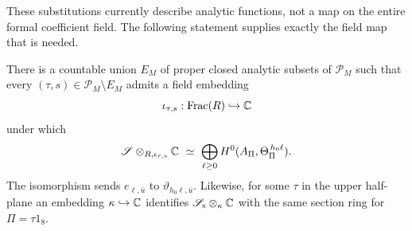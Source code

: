 These substitutions currently describe analytic functions, not a map
on the entire formal coefficient field.  The following statement supplies
exactly the field map that is needed.

\begin{proposition}\label{theta:realization}
There is a countable union $E_M$ of proper closed analytic subsets of
$\mathcal P_M$ such that every $(\tau,s)\in\mathcal P_M\setminus E_M$
admits a field embedding
\[
 \iota_{\tau,s}:\operatorname{Frac}(R)\hookrightarrow\mathbb C
\]
under which
\begin{equation}\label{theta:generic-section-ring}
 \mathscr S\otimes_{R,\iota_{\tau,s}}\mathbb C
 \ \simeq\
 \bigoplus_{\ell\geq0}
       H^0(A_\Pi,\Theta_\Pi^{\,h_0\ell}).
\end{equation}
The isomorphism sends $e_{\ell,\bar u}$ to
$\vartheta_{h_0\ell,\bar u}$.  Likewise, for some
$\tau$ in the upper half-plane an embedding $\kappa\hookrightarrow\mathbb C$
identifies $\mathscr S_{\mathrm s}\otimes_\kappa\mathbb C$ with the same section
ring for $\Pi=\tau1_8$.
\end{proposition}

